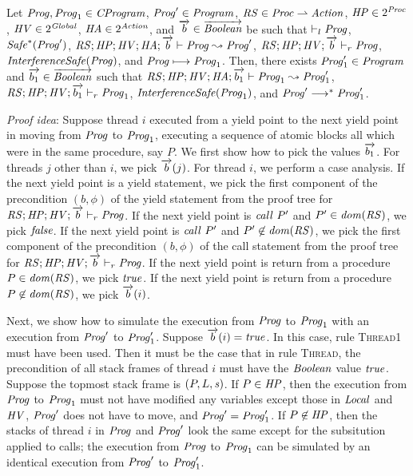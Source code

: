 \begin{lemma}
\label{lemma:refinement-induction}
Let $\mathit{Prog},\mathit{Prog}_1 \in \mathit{CProgram}$, $\mathit{Prog}' \in \mathit{Program}$,
$\mathit{RS} \in \mathit{Proc} \rightharpoonup \mathit{Action}$, $\mathit{HP} \in 2^{\mathit{Proc}}$, $\mathit{HV} \in 2^{\mathit{Global}}$, $\mathit{HA} \in 2^{\mathit{Action}}$,
and $\overrightarrow{b} \in \overrightarrow{\mathit{Boolean}}$ be such that $\vdash_l \mathit{Prog}$, $\mathit{Safe}^*(\mathit{Prog}')$, 
$\mathit{RS};\mathit{HP};\mathit{HV};\mathit{HA};\overrightarrow{b} \vdash \mathit{Prog} \leadsto \mathit{Prog}'$, $\mathit{RS};\mathit{HP};\mathit{HV};\overrightarrow{b} \vdash_r \mathit{Prog}$, 
$\mathit{InterferenceSafe}(\mathit{Prog})$, and $\mathit{Prog} \longmapsto \mathit{Prog}_1$.
Then, there exists $\mathit{Prog}'_1 \in \mathit{Program}$ and $\overrightarrow{b_1} \in \overrightarrow{\mathit{Boolean}}$ such that 
$\mathit{RS};\mathit{HP};\mathit{HV};\mathit{HA};\overrightarrow{b_1} \vdash \mathit{Prog}_1 \leadsto \mathit{Prog}'_1$, 
$\mathit{RS};\mathit{HP};\mathit{HV};\overrightarrow{b_1} \vdash_r \mathit{Prog}_1$, $\mathit{InterferenceSafe}(\mathit{Prog}_1)$, and $\mathit{Prog}' \longrightarrow^* \mathit{Prog}'_1$.
\end{lemma}
{\em Proof idea}:
Suppose thread $i$ executed from a yield point to the next yield point in moving from $\mathit{Prog}$ to $\mathit{Prog}_1$,
executing a sequence of atomic blocks all which were in the same procedure, say $P$.
We first show how to pick the values $\overrightarrow{b_1}$.
For threads $j$ other than $i$, we pick $\overrightarrow{b}(j)$.
For thread $i$, we perform a case analysis.
If the next yield point is a yield statement, we pick the first component of the 
precondition $(b,\phi)$ of the yield statement from the proof tree for $\mathit{RS};\mathit{HP};\mathit{HV};\overrightarrow{b} \vdash_r \mathit{Prog}$.
If the next yield point is $\mathit{call}\ P'$ and $P' \in \mathit{dom}(\mathit{RS})$, we pick $\mathit{false}$.
If the next yield point is $\mathit{call}\ P'$ and $P' \not \in \mathit{dom}(\mathit{RS})$, we pick the first component of the 
precondition $(b,\phi)$ of the call statement from the proof tree for $\mathit{RS};\mathit{HP};\mathit{HV};\overrightarrow{b} \vdash_r \mathit{Prog}$.
If the next yield point is return from a procedure $P \in \mathit{dom}(\mathit{RS})$, we pick $\mathit{true}$.
If the next yield point is return from a procedure $P \not \in \mathit{dom}(\mathit{RS})$, we pick $\overrightarrow{b}(i)$.

Next, we show how to simulate the execution from $\mathit{Prog}$ to $\mathit{Prog}_1$ with an execution from $\mathit{Prog}'$ to $\mathit{Prog}'_1$.
Suppose $\overrightarrow{b}(i) = \mathit{true}$.
In this case, rule \textsc{Thread1} must have been used.
Then it must be the case that in rule \textsc{Thread}, the precondition of all stack frames of thread $i$ must have the $\mathit{Boolean}$ value $\mathit{true}$.
Suppose the topmost stack frame is $(P,L,\mathit{s})$.
If $P \in \mathit{HP}$, then the execution from $\mathit{Prog}$ to $\mathit{Prog}_1$ must not have modified any variables except those in $\mathit{Local}$
and $\mathit{HV}$, $\mathit{Prog}'$ does not have to move, and $\mathit{Prog}' = \mathit{Prog}'_1$.
If $P \not\in \mathit{HP}$, then the stacks of thread $i$ in $\mathit{Prog}$ and $\mathit{Prog}'$ look the same except for the subsitution applied to calls;
the execution from $\mathit{Prog}$ to $\mathit{Prog}_1$ can be simulated by an identical execution from $\mathit{Prog}'$ to $\mathit{Prog}'_1$.

